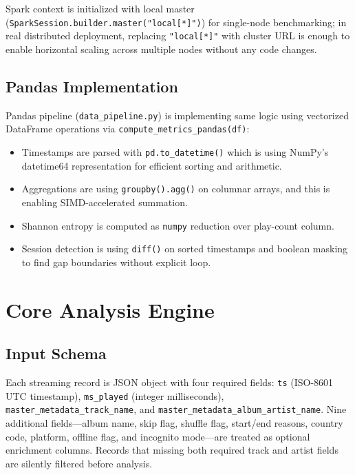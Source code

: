 \documentclass[conference]{IEEEtran}
\begin{document}
Spark context is initialized with local master (\texttt{SparkSession.builder.master("local[*]")}) for single-node benchmarking; in real distributed deployment, replacing \texttt{"local[*]"} with cluster URL is enough to enable horizontal scaling across multiple nodes without any code changes.

\subsection{Pandas Implementation}

Pandas pipeline (\texttt{data\_pipeline.py}) is implementing same logic using vectorized DataFrame operations via \texttt{compute\_metrics\_pandas(df)}:

\begin{itemize}
  \item Timestamps are parsed with \texttt{pd.to\_datetime()} which is using
        NumPy's datetime64 representation for efficient sorting and arithmetic.
  \item Aggregations are using \texttt{groupby().agg()} on columnar arrays,
        and this is enabling SIMD-accelerated summation.
  \item Shannon entropy is computed as \texttt{numpy} reduction over
        play-count column.
  \item Session detection is using \texttt{diff()} on sorted timestamps and
        boolean masking to find gap boundaries without explicit loop.
\end{itemize}

\section{Core Analysis Engine}

\subsection{Input Schema}

Each streaming record is JSON object with four required fields: \texttt{ts} (ISO-8601 UTC timestamp), \texttt{ms\_played} (integer milliseconds), \texttt{master\_metadata\_track\_name}, and \texttt{master\_metadata\_album\_artist\_name}. Nine additional fields---album name, skip flag, shuffle flag, start/end reasons, country code, platform, offline flag, and incognito mode---are treated as optional enrichment columns. Records that missing both required track and artist fields are silently filtered before analysis.
\end{document}
